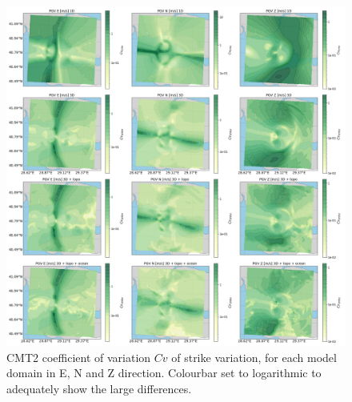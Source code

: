 \documentclass[../Text/00main.tex]{subfiles}
\begin{document}
\begin{figure}
    \centering
    \includegraphics[width=1\linewidth]{images_results/strike_variation_sigma_sc3.png}
    \caption{CMT2 coefficient of variation $Cv$ of strike variation, for each model domain in E, N and Z direction. Colourbar set to logarithmic to adequately show the large differences.}
    \label{fig:cmt2sigm}
\end{figure}
\end{document}
